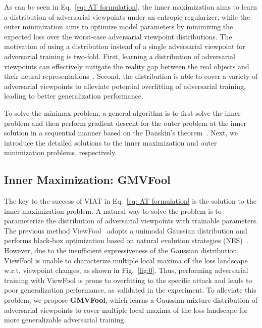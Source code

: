 \documentclass[10pt,journal,compsoc]{IEEEtran}
\begin{document}
As can be seen in Eq.~\eqref{eq: AT formulation}, the inner maximization aims to learn a distribution of adversarial viewpoints under an entropic regularizer, while the outer minimization aims to optimize model parameters by minimizing the expected loss over the worst-case adversarial viewpoint distributions. The motivation of using a distribution instead of a single adversarial viewpoint for adversarial training is two-fold. First, learning a distribution of adversarial viewpoints can effectively mitigate the reality gap between the real objects and their neural representations~\cite{dong2022viewfool}. Second,
the distribution is able to cover a variety of adversarial viewpoints to alleviate potential overfitting of adversarial training, leading to better generalization performance. 

To solve the minimax problem, a general algorithm is to first solve the inner problem and then perform gradient descent for the outer problem at the inner solution in a sequential manner based on the Danskin's theorem~\cite{danskin2012theory}. Next, we introduce the detailed solutions to the inner maximization and outer minimization problems, respectively.



\subsection{Inner Maximization: GMVFool}
\label{sec:Attack}

The key to the success of VIAT in Eq.~\eqref{eq: AT formulation} is the solution to the inner maximization problem. A natural way to solve the problem is to parameterize the distribution of adversarial viewpoints with trainable parameters. The previous method ViewFool~\cite{dong2022viewfool} adopts a unimodal Gaussian distribution and performs black-box optimization based on natural evolution strategies (NES)~\cite{wierstra2014natural}. However, due to the insufficient expressiveness of the Gaussian distribution, ViewFool is unable to characterize multiple local maxima of the loss landscape w.r.t. viewpoint changes, as shown in Fig.~\ref{fig:0}. Thus, performing adversarial training with ViewFool is prone to overfitting to the specific attack and leads to poor generalization performance, as validated in the experiment. To alleviate this problem, we propose \textbf{GMVFool}, which learns a Gaussian mixture distribution of adversarial viewpoints to cover multiple local maxima of the loss landscape for more generalizable adversarial training. 
\end{document}
